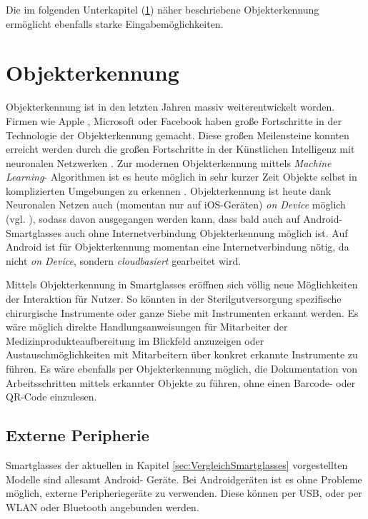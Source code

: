 Die im folgenden Unterkapitel (\ref{sec:Objekterkennung}) näher beschriebene Objekterkennung ermöglicht ebenfalls starke Eingabemöglichkeiten.
%
%
%
%
%
%
\section{Objekterkennung}
\label{sec:Objekterkennung}
Objekterkennung ist in den letzten Jahren massiv weiterentwickelt worden. Firmen wie Apple \cite{Apple2018b}, Microsoft \cite{Girshick2015} oder Facebook \cite{Schroepfer2015} haben große Fortschritte in der Technologie der Objekterkennung gemacht. Diese großen Meilensteine konnten erreicht werden durch die großen Fortschritte in der Künstlichen Intelligenz mit neuronalen Netzwerken \cite{Apple2018b, Schroepfer2015}. Zur modernen Objekterkennung mittels \emph{Machine Learning}- Algorithmen ist es heute möglich in sehr kurzer Zeit Objekte selbst in komplizierten Umgebungen zu erkennen \cite{Schroepfer2015}. 
Objekterkennung ist heute dank Neuronalen Netzen auch (momentan nur auf iOS-Geräten) \emph{on Device} möglich (vgl. \cite{Apple2018b}), sodass davon ausgegangen werden kann, dass bald auch auf Android- Smartglasses auch ohne Internetverbindung Objekterkennung möglich ist. Auf Android ist für Objekterkennung momentan eine Internetverbindung nötig, da nicht \emph{on Device}, sondern \emph{cloudbasiert} gearbeitet wird.

Mittels Objekterkennung in Smartglasses eröffnen sich völlig neue Möglichkeiten der Interaktion für Nutzer. So könnten in der Sterilgutversorgung spezifische chirurgische Instrumente oder ganze Siebe mit Instrumenten erkannt werden. Es wäre möglich direkte Handlungsanweisungen für Mitarbeiter der Medizinprodukteaufbereitung im Blickfeld anzuzeigen oder Austauschmöglichkeiten mit Mitarbeitern über konkret erkannte Instrumente zu führen. Es wäre ebenfalls per Objekterkennung möglich, die Dokumentation von Arbeitsschritten mittels erkannter Objekte zu führen, ohne einen Barcode- oder QR-Code einzulesen.
%
%
%
%
%
%
\subsection{Externe Peripherie}
\label{sec:Externe_Peripherie}
Smartglasses der aktuellen in Kapitel \ref{sec:VergleichSmartglasses} vorgestellten Modelle sind allesamt Android- Geräte. Bei Androidgeräten ist es ohne Probleme möglich, externe Peripheriegeräte zu verwenden. Diese können per USB, oder per WLAN oder Bluetooth angebunden werden. 

